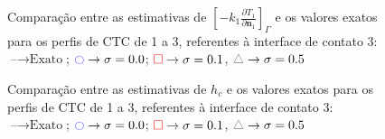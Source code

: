 %
\begin{figure}[h!b]
	\caption{Comparação entre as estimativas de $\left[-k_1 \frac{\partial T_1}{\partial\mathbf{n}_1}\right]_\Gamma$ e os valores exatos para os perfis de CTC de 1 a 3, referentes à interface de contato 3: $\text{--} \rightarrow \text{Exato}$; $\textcolor{blue}{\ocircle} \rightarrow \sigma = 0.0$; $\textcolor{red}{\square} \rightarrow \sigma = 0.1$, $\textcolor{gray}{\triangle} \rightarrow \sigma = 0.5$}
\end{figure}
%
%
\begin{figure}[h!b]
	\caption{Comparação entre as estimativas de $h_c$ e os valores exatos para os perfis de CTC de 1 a 3, referentes à interface de contato 3: $\text{--} \rightarrow \text{Exato}$; $\textcolor{blue}{\ocircle} \rightarrow \sigma = 0.0$; $\textcolor{red}{\square} \rightarrow \sigma = 0.1$, $\textcolor{gray}{\triangle} \rightarrow \sigma = 0.5$}
\end{figure}



